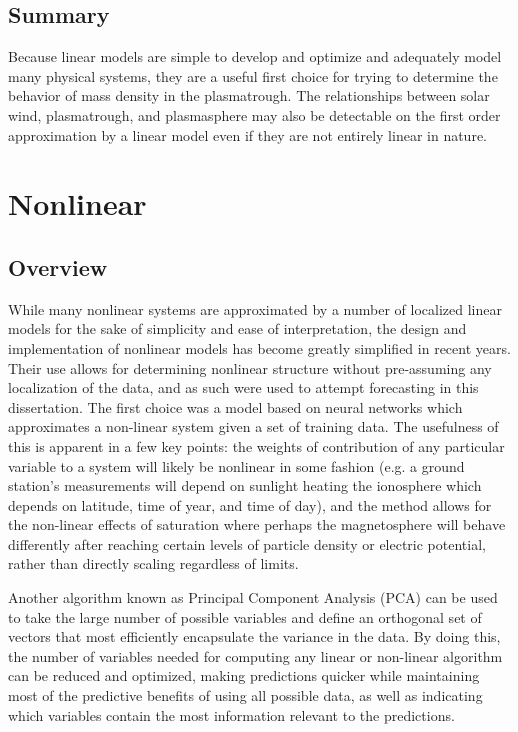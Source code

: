 \subsection{Summary}
Because linear models are simple to develop and optimize and adequately model many physical systems, they are a useful first choice for trying to determine the behavior of mass density in the plasmatrough. The relationships between solar wind, plasmatrough, and plasmasphere may also be detectable on the first order approximation by a linear model even if they are not entirely linear in nature.


\section{Nonlinear}

\subsection{Overview}

While many nonlinear systems are approximated by a number of localized linear models for the sake of simplicity and ease of interpretation, the design and implementation of nonlinear models has become greatly simplified in recent years. Their use allows for determining nonlinear structure without pre-assuming any localization of the data, and as such were used to attempt forecasting in this dissertation. The first choice was a model based on neural networks \citep{NNARMA,ANNforecast} which approximates a non-linear system given a set of training data. The usefulness of this is apparent in a few key points: the weights of contribution of any particular variable to a system will likely be nonlinear in some fashion (e.g. a ground station's measurements will depend on sunlight heating the ionosphere which depends on latitude, time of year, and time of day), and the method allows for the non-linear effects of saturation where perhaps the magnetosphere will behave differently after reaching certain levels of particle density or electric potential, rather than directly scaling regardless of limits.

Another algorithm known as Principal Component Analysis (PCA) can be used to take the large number of possible variables and define an orthogonal set of vectors that most efficiently encapsulate the variance in the data. By doing this, the number of variables needed for computing any linear or non-linear algorithm can be reduced and optimized, making predictions quicker while maintaining most of the predictive benefits of using all possible data, as well as indicating which variables contain the most information relevant to the predictions.



